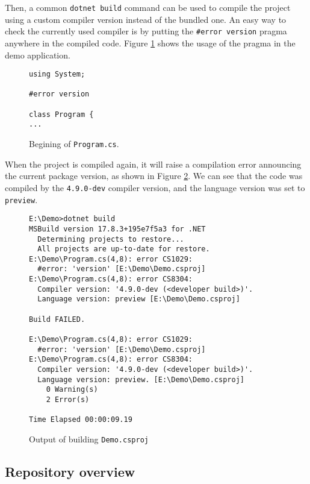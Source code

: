 \par
Then, a common \texttt{dotnet build} command can be used to compile the project using a custom compiler version instead of the bundled one. 
An easy way to check the currently used compiler is by putting the \texttt{\#error version} pragma anywhere in the compiled code. 
Figure \ref{img66:pragma} shows the usage of the pragma in the demo application.
\begin{figure}[h]
\begin{lstlisting}
using System;

#error version

class Program {
...
\end{lstlisting}
\caption{Begining of \texttt{Program.cs}.}
\label{img66:pragma}
\end{figure}
\par
When the project is compiled again, it will raise a compilation error announcing the current package version, as shown in Figure \ref{img67:output}. 
We can see that the code was compiled by the \texttt{4.9.0-dev} compiler version, and the language version was set to \texttt{preview}.
\begin{figure}[h]
\begin{lstlisting}
E:\Demo>dotnet build
MSBuild version 17.8.3+195e7f5a3 for .NET
  Determining projects to restore...
  All projects are up-to-date for restore.
E:\Demo\Program.cs(4,8): error CS1029: 
  #error: 'version' [E:\Demo\Demo.csproj]
E:\Demo\Program.cs(4,8): error CS8304: 
  Compiler version: '4.9.0-dev (<developer build>)'. 
  Language version: preview [E:\Demo\Demo.csproj]

Build FAILED.

E:\Demo\Program.cs(4,8): error CS1029: 
  #error: 'version' [E:\Demo\Demo.csproj]
E:\Demo\Program.cs(4,8): error CS8304: 
  Compiler version: '4.9.0-dev (<developer build>)'. 
  Language version: preview. [E:\Demo\Demo.csproj]
    0 Warning(s)
    2 Error(s)

Time Elapsed 00:00:09.19
\end{lstlisting}
\caption{Output of building \texttt{Demo.csproj}}
\label{img67:output}
\end{figure}

\subsection{Repository overview}

